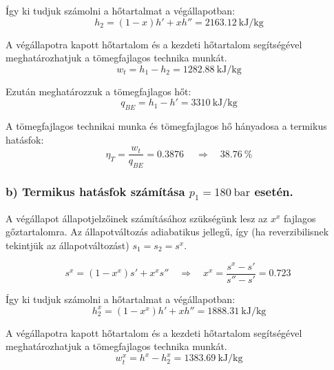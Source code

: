 \noindent Így ki tudjuk számolni a hőtartalmat a végállapotban:
\begin{equation}
	h_2 = \left(1 - x\right) h' + x h'' = \SI{2163,12}{\kilo\joule\per\kilogram}
\end{equation}

\noindent A végállapotra kapott hőtartalom és a kezdeti hőtartalom segítségével meghatározhatjuk a tömegfajlagos technika munkát.
\begin{equation}
	w_t = h_1 - h_2 = \SI{1282,88}{\kilo\joule\per\kilogram}
\end{equation}

\noindent Ezután meghatározzuk a tömegfajlagos hőt:
\begin{equation}
	q_{BE} = h_1 - h' = \SI{3310}{\kilo\joule\per\kilogram}
\end{equation}

\pagebreak


\noindent A tömegfajlagos technikai munka és tömegfajlagos hő hányadosa a termikus hatásfok:
\begin{equation}
	\eta_{T} = \dfrac{w_t}{q_{BE}} = \SI{0,3876}{}
		\quad 
	\Rightarrow
	\quad 
	\SI{38,76}{\percent}
\end{equation}

\subsubsection*{b) Termikus hatásfok számítása $p_1=\SI{180}{\bar}$ esetén.}

A végállapot állapotjelzőinek számításához szükségünk lesz az $x^x$ fajlagos gőztartalomra. Az állapotváltozás adiabatikus jellegű, így (ha reverzibilisnek tekintjük az állapotváltozást) $s_1 = s_2 = s^x $.

\begin{equation}
s^x = \left(1 - x^x\right) s' + x^x s''
\quad 
\Rightarrow
\quad 
x^x =	\dfrac{s^x - s'}{s'' - s'} = \SI{0,723}{}
\end{equation}


\noindent Így ki tudjuk számolni a hőtartalmat a végállapotban:
\begin{equation}
h_2^x = \left(1 - x^x\right) h' + x h'' = \SI{1888,31}{\kilo\joule\per\kilogram}
\end{equation}

\noindent A végállapotra kapott hőtartalom és a kezdeti hőtartalom segítségével meghatározhatjuk a tömegfajlagos technika munkát.
\begin{equation}
w_t^x = h^x- h_2^x = \SI{1383,69}{\kilo\joule\per\kilogram}
\end{equation}

